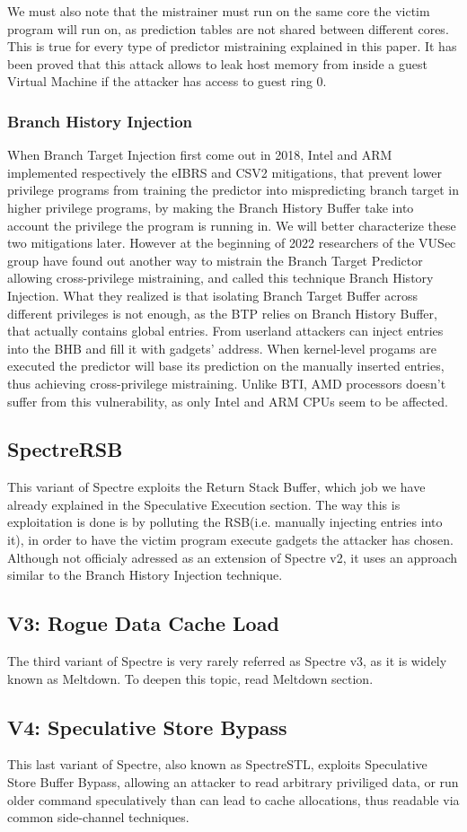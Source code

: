 We must also note that the mistrainer must run on the same core the victim program will run on, as prediction tables are not shared between different cores.
This is true for every type of predictor mistraining explained in this paper.
It has been proved that this attack allows to leak host memory from inside a guest Virtual Machine if the attacker has access to guest ring 0.

\subsubsection{Branch History Injection}
When Branch Target Injection first come out in 2018, Intel and ARM implemented respectively the eIBRS and CSV2 mitigations, that prevent lower privilege programs from training the predictor into mispredicting branch target in higher privilege programs, by making the Branch History Buffer take into account the privilege the program is running in. 
We will better characterize these two mitigations later.
However at the beginning of 2022 researchers of the VUSec group have found out another way to mistrain the Branch Target Predictor allowing cross-privilege mistraining, and called this technique Branch History Injection.
What they realized is that isolating Branch Target Buffer across different privileges is not enough, as the BTP relies on Branch History Buffer, that actually contains global entries.
From userland attackers can inject entries into the BHB and fill it with gadgets' address. When kernel-level progams are executed the predictor will base its prediction on the manually inserted entries, thus achieving cross-privilege mistraining.
Unlike BTI, AMD processors doesn't suffer from this vulnerability, as only Intel and ARM CPUs seem to be affected.

\subsection{SpectreRSB}
This variant of Spectre exploits the Return Stack Buffer, which job we have already explained in the Speculative Execution section.
The way this is exploitation is done is by polluting the RSB(i.e. manually injecting entries into it), in order to have the victim program execute gadgets the attacker has chosen.
Although not officialy adressed as an extension of Spectre v2, it uses an approach similar to the Branch History Injection technique.

\subsection{V3: Rogue Data Cache Load}
The third variant of Spectre is very rarely referred as Spectre v3, as it is widely known as Meltdown. To deepen this topic, read Meltdown section.

\subsection{V4: Speculative Store Bypass}
This last variant of Spectre, also known as SpectreSTL, exploits Speculative Store Buffer Bypass, allowing an attacker to read arbitrary priviliged data, or run older command speculatively than can lead to cache allocations, thus readable via common side-channel techniques.
